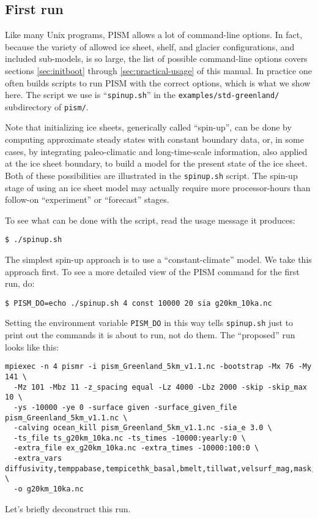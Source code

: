 \subsection{First run}   \label{subsect:runscript}  Like many Unix programs, PISM allows a lot of command-line options.  In fact, because the variety of allowed ice sheet, shelf, and glacier configurations, and included sub-models, is so large, the list of possible command-line options covers sections \ref{sec:initboot} through \ref{sec:practical-usage} of this manual.  In practice one often builds scripts to run PISM with the correct options, which is what we show here.  The script we use is ``\texttt{spinup.sh}'' in the \texttt{examples/std-greenland/} subdirectory of \texttt{pism/}.

Note that initializing ice sheets, generically called ``spin-up'', can be done by computing approximate steady states with constant boundary data, or, in some cases, by integrating paleo-climatic and long-time-scale information, also applied at the ice sheet boundary, to build a model for the present state of the ice sheet.  Both of these possibilities are illustrated in the \texttt{spinup.sh} script.  The spin-up stage of using an ice sheet model may actually require more processor-hours than follow-on ``experiment'' or ``forecast'' stages.

To see what can be done with the script, read the usage message it produces:
\begin{verbatim}
$ ./spinup.sh
\end{verbatim}

The simplest spin-up approach is to use a ``constant-climate'' model.  We take this approach first.  To see a more detailed view of the PISM command for the first run, do:
\begin{verbatim}
$ PISM_DO=echo ./spinup.sh 4 const 10000 20 sia g20km_10ka.nc
\end{verbatim}
Setting the environment variable \texttt{PISM_DO} in this way tells \texttt{spinup.sh} just to print out the commands it is about to run, not do them.  The ``proposed'' run looks like this:
\label{firstcommand}
\small
\begin{verbatim}
mpiexec -n 4 pismr -i pism_Greenland_5km_v1.1.nc -bootstrap -Mx 76 -My 141 \
  -Mz 101 -Mbz 11 -z_spacing equal -Lz 4000 -Lbz 2000 -skip -skip_max 10 \
  -ys -10000 -ye 0 -surface given -surface_given_file pism_Greenland_5km_v1.1.nc \
  -calving ocean_kill pism_Greenland_5km_v1.1.nc -sia_e 3.0 \
  -ts_file ts_g20km_10ka.nc -ts_times -10000:yearly:0 \
  -extra_file ex_g20km_10ka.nc -extra_times -10000:100:0 \
  -extra_vars diffusivity,temppabase,tempicethk_basal,bmelt,tillwat,velsurf_mag,mask,thk,topg,usurf \
  -o g20km_10ka.nc
\end{verbatim}
\normalsize
Let's briefly deconstruct this run.

